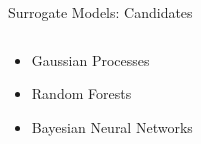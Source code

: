 \begin{frame}[c]{Surrogate Models: Candidates}

\begin{columns}[T] %
\begin{column}{.48\textwidth}
\begin{itemize}
	\item<1-3> Gaussian Processes 
	\item<2-3> Random Forests 
	\item<3-3> Bayesian Neural Networks 
\end{itemize}
\end{column}%

\hfill%


\end{columns}
\end{frame}
